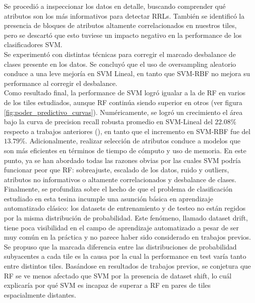 Se procedió a inspeccionar los datos en detalle, buscando comprender qué atributos son los más informativos para detectar RRLs. También se identificó la presencia de bloques de atributos altamente correlacionados en nuestros tiles, pero se descartó que esto tuviese un impacto negativo en la performance de los clasificadores SVM. \\

Se experimentó con distintas técnicas para corregir el marcado desbalance de clases presente en los datos. Se concluyó que el uso de oversampling aleatorio conduce a una leve mejoría en SVM Lineal, en tanto que SVM-RBF no mejora su performance al corregir el desbalance. \\

Como resultado final, la performance de SVM logró igualar a la de RF en varios de los tiles estudiados, aunque RF continúa siendo superior en otros (ver figura \ref{fig:poder_predictivo_curvas}). Numéricamente, se logró un crecimiento el área bajo la curva de precision recall robusta promedio en SVM-Lineal del $22.08\%$ respecto a trabajos anteriores (\cite{jbc}), en tanto que el incremento en SVM-RBF fue del $13.79\%$. Adicionalmente, realizar selección de atributos conduce a modelos que son más eficientes en términos de tiempo de cómputo y uso de memoria. En este punto, ya se han abordado todas las razones obvias por las cuales SVM podría funcionar peor que RF: sobreajuste, escalado de los datos, ruido y outliers, atributos no informativos o altamente correlacionados y desbalance de clases. \\

Finalmente, se profundiza sobre el hecho de que el problema de clasificación estudiado en esta tesina incumple una asunción básica en aprendizaje automatizado clásico: los datasets de entrenamiento y de testeo no están regidos por la misma distribución de probabilidad. Este fenómeno, llamado dataset drift, tiene poca visibilidad en el campo de aprendizaje automatizado a pesar de ser muy común en la práctica y no parece haber sido considerado en trabajos previos. \\

Se propuso que la marcada diferencia entre las distribuciones de probabilidad subyacentes a cada tile es la causa por la cual la performance en test varía tanto entre distintos tiles. Basándose en resultados de trabajos previos, se conjetura que RF se ve menos afectado que SVM por la presencia de dataset shift, lo cuál explicaría por qué SVM es incapaz de superar a RF en pares de tiles espacialmente distantes. \\

